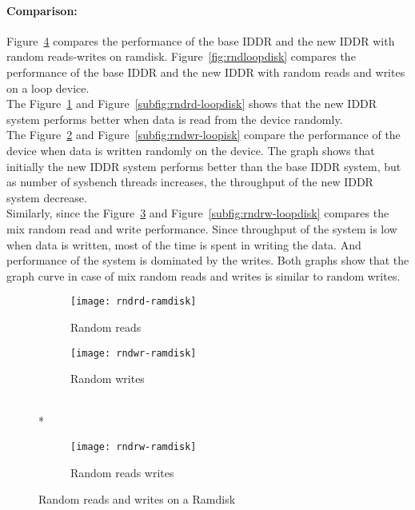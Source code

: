 \paragraph{Comparison:}
Figure~\ref{fig:rndramdisk} compares the performance of the base IDDR and the new IDDR with random reads-writes on ramdisk. Figure~\ref{fig:rndloopdisk} compares the performance of the base IDDR and the new IDDR with random reads and writes on a loop device. 
\\[3mm]
The Figure~\ref{subfig:rndrd-ramdisk} and Figure~\ref{subfig:rndrd-loopdisk} shows that the new IDDR system performs better when data is read from the device randomly.  
\\[3mm]
The Figure~\ref{subfig:rndwr-ramdisk} and Figure~\ref{subfig:rndwr-loopisk} compare the performance of the device when data is written randomly on the device. The graph shows that initially the new IDDR system performs better than the base IDDR system, but as number of sysbench threads increases, the throughput of the new IDDR system decrease.
\\[3mm] 
Similarly, since the Figure~\ref{subfig:rndrw-ramdisk} and Figure~\ref{subfig:rndrw-loopdisk} compares the mix random read and write performance. Since throughput of the system is low when data is written, most of the time is spent in writing the data. And performance of the system is dominated by the writes. Both graphs show that the graph curve in case of mix random reads and writes is similar to random writes. 

\begin{figure}[!ht]
  \begin{subfigure}[b]{0.2\textwidth}
  \texttt{[image: rndrd-ramdisk]}
  \caption{Random reads}
  \label{subfig:rndrd-ramdisk}
  \end{subfigure}
  \hspace{50mm}
  \begin{subfigure}[b]{0.2\textwidth}
  \texttt{[image: rndwr-ramdisk]}
  \caption{Random writes}
  \label{subfig:rndwr-ramdisk}
  \end{subfigure}\\*
  \hspace{150mm}
  \begin{subfigure}[b]{0.3\textwidth}
  \texttt{[image: rndrw-ramdisk]}
  \caption{Random reads writes}
  \label{subfig:rndrw-ramdisk}
  \end{subfigure}
  \caption{Random reads and writes on a Ramdisk}\label{fig:rndramdisk}
\end{figure}

